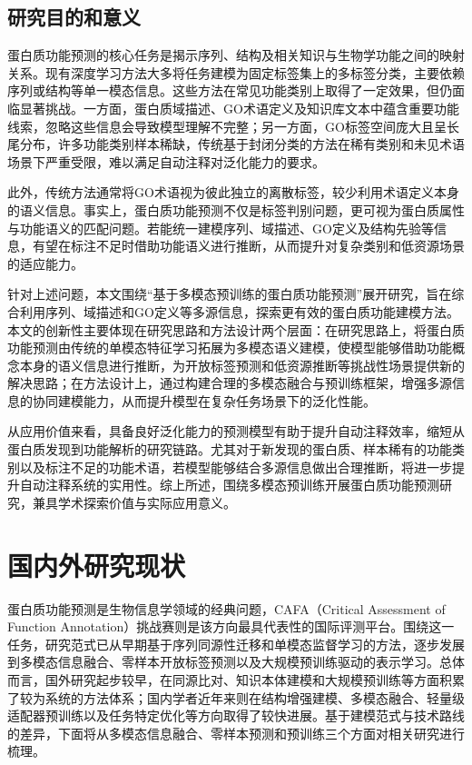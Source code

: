 \subsection{研究目的和意义}

蛋白质功能预测的核心任务是揭示序列、结构及相关知识与生物学功能之间的映射关系。现有深度学习方法大多将任务建模为固定标签集上的多标签分类，主要依赖序列或结构等单一模态信息。这些方法在常见功能类别上取得了一定效果，但仍面临显著挑战。一方面，蛋白质域描述、GO术语定义及知识库文本中蕴含重要功能线索，忽略这些信息会导致模型理解不完整；另一方面，GO标签空间庞大且呈长尾分布，许多功能类别样本稀缺，传统基于封闭分类的方法在稀有类别和未见术语场景下严重受限，难以满足自动注释对泛化能力的要求。

此外，传统方法通常将GO术语视为彼此独立的离散标签，较少利用术语定义本身的语义信息。事实上，蛋白质功能预测不仅是标签判别问题，更可视为蛋白质属性与功能语义的匹配问题。若能统一建模序列、域描述、GO定义及结构先验等信息，有望在标注不足时借助功能语义进行推断，从而提升对复杂类别和低资源场景的适应能力。

针对上述问题，本文围绕“基于多模态预训练的蛋白质功能预测”展开研究，旨在综合利用序列、域描述和GO定义等多源信息，探索更有效的蛋白质功能建模方法。本文的创新性主要体现在研究思路和方法设计两个层面：在研究思路上，将蛋白质功能预测由传统的单模态特征学习拓展为多模态语义建模，使模型能够借助功能概念本身的语义信息进行推断，为开放标签预测和低资源推断等挑战性场景提供新的解决思路；在方法设计上，通过构建合理的多模态融合与预训练框架，增强多源信息的协同建模能力，从而提升模型在复杂任务场景下的泛化性能。

从应用价值来看，具备良好泛化能力的预测模型有助于提升自动注释效率，缩短从蛋白质发现到功能解析的研究链路。尤其对于新发现的蛋白质、样本稀有的功能类别以及标注不足的功能术语，若模型能够结合多源信息做出合理推断，将进一步提升自动注释系统的实用性。综上所述，围绕多模态预训练开展蛋白质功能预测研究，兼具学术探索价值与实际应用意义。

\section{国内外研究现状}

蛋白质功能预测是生物信息学领域的经典问题，CAFA（Critical Assessment of Function Annotation）\cite{zhou2019cafa}挑战赛则是该方向最具代表性的国际评测平台。围绕这一任务，研究范式已从早期基于序列同源性迁移和单模态监督学习的方法，逐步发展到多模态信息融合、零样本开放标签预测以及大规模预训练驱动的表示学习。总体而言，国外研究起步较早，在同源比对、知识本体建模和大规模预训练等方面积累了较为系统的方法体系；国内学者近年来则在结构增强建模、多模态融合、轻量级适配器预训练以及任务特定优化等方向取得了较快进展。基于建模范式与技术路线的差异，下面将从多模态信息融合、零样本预测和预训练三个方面对相关研究进行梳理。

